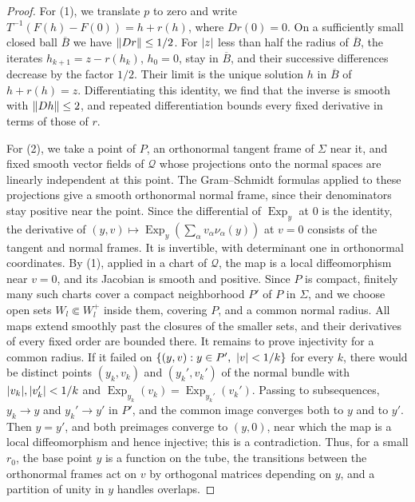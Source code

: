 \begin{proof}
For (1), we translate $p$ to zero and write $T^{-1}(F(h)-F(0))=h+r(h)$, where $Dr(0)=0$. On a sufficiently small closed ball $\overline B$ we have $\lVert Dr\rVert\le1/2$. For $\lvert z\rvert$ less than half the radius of $\overline B$, the iterates $h_{k+1}=z-r(h_k)$, $h_0=0$, stay in $\overline B$, and their successive differences decrease by the factor $1/2$. Their limit is the unique solution $h$ in $\overline B$ of $h+r(h)=z$. Differentiating this identity, we find that the inverse is smooth with $\lVert Dh\rVert\le2$, and repeated differentiation bounds every fixed derivative in terms of those of $r$.

For (2), we take a point of $P$, an orthonormal tangent frame of $\Sigma$ near it, and fixed smooth vector fields of $\mathcal Q$ whose projections onto the normal spaces are linearly independent at this point. The Gram--Schmidt formulas applied to these projections give a smooth orthonormal normal frame, since their denominators stay positive near the point. Since the differential of $\operatorname{Exp}_y$ at $0$ is the identity, the derivative of $(y,v)\mapsto\operatorname{Exp}_y(\sum_\alpha v_\alpha\nu_\alpha(y))$ at $v=0$ consists of the tangent and normal frames. It is invertible, with determinant one in orthonormal coordinates. By (1), applied in a chart of $\mathcal Q$, the map is a local diffeomorphism near $v=0$, and its Jacobian is smooth and positive. Since $P$ is compact, finitely many such charts cover a compact neighborhood $P'$ of $P$ in $\Sigma$, and we choose open sets $W_l\Subset W_l^+$ inside them, covering $P$, and a common normal radius. All maps extend smoothly past the closures of the smaller sets, and their derivatives of every fixed order are bounded there. It remains to prove injectivity for a common radius. If it failed on $\{(y,v):y\in P',\ \lvert v\rvert<1/k\}$ for every $k$, there would be distinct points $(y_k,v_k)$ and $(y_k',v_k')$ of the normal bundle with $\lvert v_k\rvert,\lvert v_k'\rvert<1/k$ and $\operatorname{Exp}_{y_k}(v_k)=\operatorname{Exp}_{y_k'}(v_k')$. Passing to subsequences, $y_k\to y$ and $y_k'\to y'$ in $P'$, and the common image converges both to $y$ and to $y'$. Then $y=y'$, and both preimages converge to $(y,0)$, near which the map is a local diffeomorphism and hence injective; this is a contradiction. Thus, for a small $r_0$, the base point $y$ is a function on the tube, the transitions between the orthonormal frames act on $v$ by orthogonal matrices depending on $y$, and a partition of unity in $y$ handles overlaps.
\end{proof}

